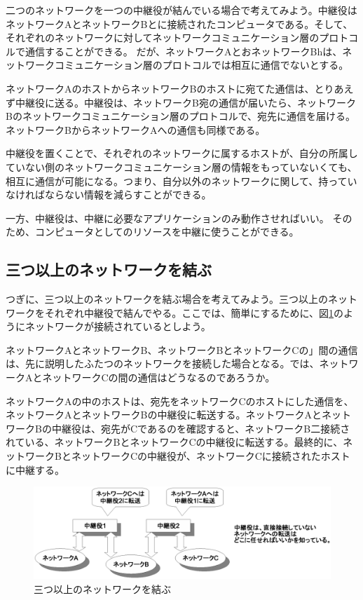 二つのネットワークを一つの中継役が結んでいる場合で考えてみよう。中継役はネットワークAとネットワークBとに接続されたコンピュータである。そして、それぞれのネットワークに対してネットワークコミュニケーション層のプロトコルで通信することができる。
だが、ネットワークAとおネットワークBhは、ネットワークコミュニケーション層のプロトコルでは相互に通信でないとする。

ネットワークAのホストからネットワークBのホストに宛てた通信は、とりあえず中継役に送る。中継役は、ネットワークB宛の通信が届いたら、ネットワークBのネットワークコミュニケーション層のプロトコルで、宛先に通信を届ける。ネットワークBからネットワークAへの通信も同様である。

中継役を置くことで、それぞれのネットワークに属するホストが、自分の所属していない側のネットワークコミュニケーション層の情報をもっていないくても、相互に通信が可能になる。つまり、自分以外のネットワークに関して、持っていなければならない情報を減らすことができる。

一方、中継役は、中継に必要なアプリケーションのみ動作させればいい。
そのため、コンピュータとしてのリソースを中継に使うことができる。

\subsection{三つ以上のネットワークを結ぶ}

つぎに、三つ以上のネットワークを結ぶ場合を考えてみよう。三つ以上のネットワークをそれぞれ中継役で結んでやる。ここでは、簡単にするために、図\ref{fig:ip_basic3}のようにネットワークが接続されているとしよう。

ネットワークAとネットワークB、ネットワークBとネットワークCの」間の通信は、先に説明したふたつのネットワークを接続した場合となる。では、ネットワークAとネットワークCの間の通信はどうなるのであろうか。

ネットワークAの中のホストは、宛先をネットワークCのホストにした通信を、ネットワークAとネットワークBの中継役に転送する。ネットワークAとネットワークBの中継役は、宛先がCであるのを確認すると、ネットワークB二接続されている、ネットワークBとネットワークCの中継役に転送する。最終的に、ネットワークBとネットワークCの中継役が、ネットワークCに接続されたホストに中継する。


\begin{figure}[htbp]
	\includegraphics[width=12cm,clip]{draw/ip_basic3.eps}
	\caption{三つ以上のネットワークを結ぶ}
	\label{fig:ip_basic3}
\end{figure}

